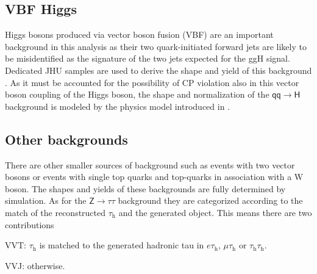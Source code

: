\subsection{VBF Higgs}
Higgs bosons produced via vector boson fusion (VBF) are an important background in this analysis as their two quark-initiated forward jets 
are likely to be misidentified as the signature of the two jets expected for the ggH signal. Dedicated JHU samples are used to derive the shape and yield of this background . 
As it must be accounted for the possibility of CP violation also in this vector boson coupling of the Higgs boson, the shape and normalization of the $\mathsf{qq\rightarrow H}$ background is modeled by the physics model introduced in .

\subsection{Other backgrounds}
There are other smaller sources of background such as events with two vector bosons or events with single top quarks
and top-quarks in association with a W boson. The shapes and yields of these backgrounds are fully determined by simulation. 
As for the $\mathsf{Z\rightarrow \tau\tau}$ background they are categorized according to the match of the reconstructed $\tau_\text{h}$ and the generated object. 
This means there are two contributions 
\begin{ct_version_list}
    \item VVT: $\tau_\text{h}$ is matched to the generated hadronic tau in $e\tau_\text{h}$, $\mu\tau_\text{h}$ or $\tau_\text{h}\tau_\text{h}$.
    \item VVJ: otherwise.
\end{ct_version_list}

